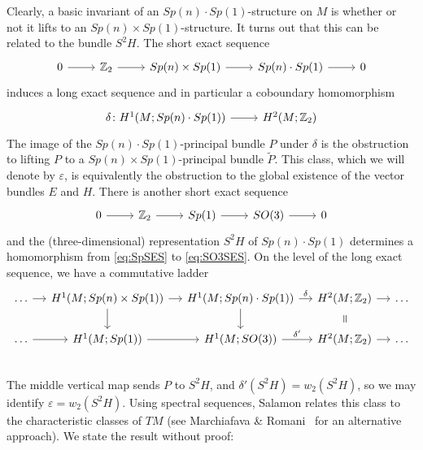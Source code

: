 Clearly, a basic invariant of an $Sp(n)\cdot Sp(1)$-structure on $M$ is whether or not it lifts to an $Sp(n)\times Sp(1)$-structure. It turns out that this can be related to the bundle $S^2H$. The short exact sequence
\begin{equation}\label{eq:SpSES}
	\begin{tikzcd}
		0 \ar[r] & \Z_2 \ar[r] & Sp(n)\times Sp(1) \ar[r] & Sp(n)\cdot Sp(1) \ar[r] & 0
	\end{tikzcd}
\end{equation}
induces a long exact sequence and in particular a coboundary homomorphism
\begin{equation*}
	\begin{tikzcd}
		\delta\colon H^1(M;Sp(n)\cdot Sp(1))\ar[r] & H^2(M;\Z_2)
	\end{tikzcd}
\end{equation*}
The image of the $Sp(n)\cdot Sp(1)$-principal bundle $P$ under $\delta$ is the obstruction to lifting $P$ to a $Sp(n)\times Sp(1)$-principal bundle $\tilde P$. This class, which we will denote by $\varepsilon$, is equivalently the obstruction to the global existence of the vector bundles $E$ and $H$. There is another short exact sequence 
\begin{equation}\label{eq:SO3SES}
	\begin{tikzcd}
		0\ar[r] & \Z_2 \ar[r] & Sp(1) \ar[r] & SO(3) \ar[r] & 0
	\end{tikzcd}
\end{equation}
and the (three-dimensional) representation $S^2H$ of $Sp(n)\cdot Sp(1)$ determines a homomorphism from \eqref{eq:SpSES} to \eqref{eq:SO3SES}. On the level of the long exact sequence, we have a commutative ladder
\begin{equation*}
	\begin{tikzcd}[column sep=small]
		\dots \ar[r] & H^1(M;Sp(n)\times Sp(1)) \ar[r] \ar[d] & H^1(M;Sp(n)\cdot Sp(1)) \ar[r,"\delta"] \ar[d] 
		& H^2(M;\Z_2) \ar[r] \ar[draw=none]{d}[sloped,auto=false]{\scalebox{1.3}[1.3]{$=$}} & \dots \\
		\dots \ar[r] & H^1(M;Sp(1)) \ar[r] & H^1(M;SO(3)) \ar[r,"\delta'"] & H^2(M;\Z_2) \ar[r] & \dots \\
	\end{tikzcd}
\end{equation*}
The middle vertical map sends $P$ to $S^2H$, and $\delta'(S^2H)=w_2(S^2H)$, so we may identify $\varepsilon=w_2(S^2H)$. Using spectral sequences, Salamon relates this class to the characteristic classes of $TM$ (see Marchiafava \& Romani~\cite{MR1975} for an alternative approach). We state the result without proof:

